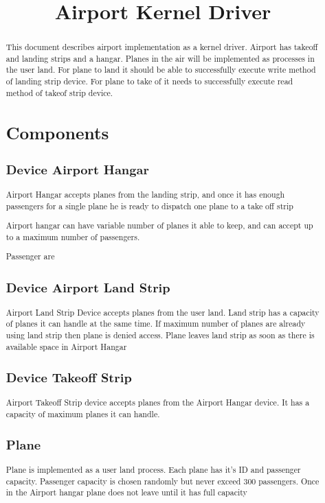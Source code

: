 \documentclass[10pt,twoside,a4paper]{article}
\begin{document}
\title{Airport Kernel Driver}
\maketitle

\begin{abstract}
This document describes airport implementation as a kernel driver. Airport has takeoff and landing strips and a hangar. Planes in the air will be implemented as processes in the user land. For plane to land it should be able to successfully execute write method of landing strip device. For plane to take of it needs to successfully execute read method of takeof strip device.

\tableofcontents

\section{Components}
\subsection{Device Airport Hangar}
Airport Hangar accepts planes from the landing strip, and once it has enough passengers for a single plane he is ready to dispatch one plane to a take off strip

Airport hangar can have variable number of planes it able to keep, and can accept up to a maximum number of passengers.

Passenger are 

\subsection{Device Airport Land Strip}
Airport Land Strip Device accepts planes from the user land. Land strip has a capacity of planes it can handle at the same time. If maximum number of planes are already using land strip then plane is denied access. Plane leaves land strip as soon as there is available space in Airport Hangar

\subsection{Device Takeoff Strip}
Airport Takeoff Strip device accepts planes from the Airport Hangar device. It has a capacity of maximum planes it can handle.

\subsection{Plane}
Plane is implemented as a user land process. Each plane has it's ID and passenger capacity.
Passenger capacity is chosen randomly but never exceed 300 passengers. Once in the Airport hangar plane does not leave until it has full capacity


\end{abstract}
\end{document}
